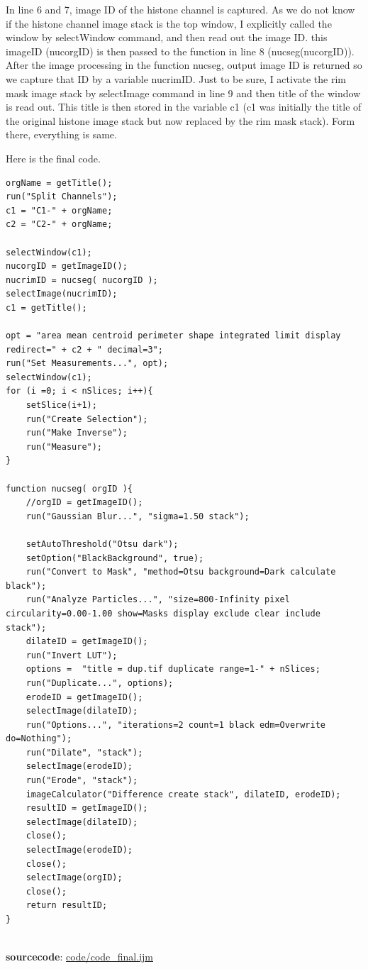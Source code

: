 \documentclass[11pt,a4paper,oneside]{report}
\begin{document}
In line 6 and 7, image ID of the histone channel is captured. As we do not know if the histone channel image stack is the top window, I explicitly called the window by selectWindow command, and then read out the image ID. this imageID (nucorgID) is then passed to the function in line 8 (nucseg(nucorgID)). After the image processing in the function nucseg, output image ID is returned so we capture that ID by a variable nucrimID. Just to be sure, I activate the rim mask image stack by selectImage command in line 9 and then title of the window is read out. This title is then stored in the variable c1 (c1 was initially the title of the original histone image stack but now replaced by the rim mask stack). Form there, everything is same. 

Here is the final code. 

 
\begin{lstlisting}[morekeywords={*, function, return, orgID, resultID, nucseg}]
orgName = getTitle();
run("Split Channels");
c1 = "C1-" + orgName;
c2 = "C2-" + orgName;

selectWindow(c1);
nucorgID = getImageID();
nucrimID = nucseg( nucorgID );
selectImage(nucrimID);
c1 = getTitle();

opt = "area mean centroid perimeter shape integrated limit display redirect=" + c2 + " decimal=3";
run("Set Measurements...", opt);
selectWindow(c1);
for (i =0; i < nSlices; i++){
	setSlice(i+1);
	run("Create Selection");
	run("Make Inverse");
	run("Measure");
}

function nucseg( orgID ){
	//orgID = getImageID();
	run("Gaussian Blur...", "sigma=1.50 stack");
	
	setAutoThreshold("Otsu dark");
	setOption("BlackBackground", true);
	run("Convert to Mask", "method=Otsu background=Dark calculate black");
	run("Analyze Particles...", "size=800-Infinity pixel circularity=0.00-1.00 show=Masks display exclude clear include stack");
	dilateID = getImageID();
	run("Invert LUT");
	options =  "title = dup.tif duplicate range=1-" + nSlices;
	run("Duplicate...", options);
	erodeID = getImageID();
	selectImage(dilateID);
	run("Options...", "iterations=2 count=1 black edm=Overwrite do=Nothing");
	run("Dilate", "stack");
	selectImage(erodeID);
	run("Erode", "stack");
	imageCalculator("Difference create stack", dilateID, erodeID);
	resultID = getImageID();
	selectImage(dilateID);
	close();
	selectImage(erodeID);
	close();
	selectImage(orgID);
	close();
	return resultID;
}


\end{lstlisting}
\textbf{sourcecode}: \href{http://www.example.com/contents}{code/code\_final.ijm}
\end{document}
